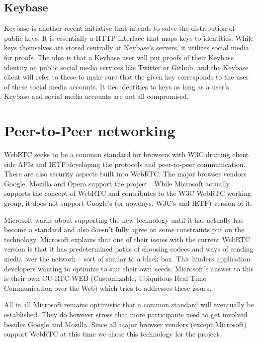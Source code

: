 \subsection{Keybase}
Keybase \cite{Keybase:Online} is another recent initiative that intends to solve the distribution of public keys. It is essentially a HTTP-interface that maps keys to identities. While keys themselves are stored centrally at Keybase's servers, it utilizes social media for proofs. The idea is that a Keybase user will put proofs of their Keybase identity on public social media services like Twitter or Github, and the Keybase client will refer to these to make sure that the given key corresponds to the user of these social media accounts. It ties identities to keys as long as a user's Keybase and social media accounts are not all compromised.

\section{Peer-to-Peer networking}


WebRTC seeks to be a common standard for browsers with W3C drafting client side APIs and IETF developing the protocols and peer-to-peer communication\cite{WebRTCWorkingGroupCharter:2013:Online}. There are also security aspects built into WebRTC. The major browser vendors Google, Mozilla and Opera support the project \cite{WebRTCAndMicrosoft:2012:Online}. While Microsoft actually supports the concept of WebRTC and contributes to the W3C WebRTC working group, it does not support Google’s (or nowdays, W3C’s and IETF) version of it\cite{WebRTCAndMicrosoft:2012:Online}.

Microsoft warns about supporting the new technology until it has actually has become a standard and also doesn’t fully agree on some constraints put on the technology\cite{WebRTCAndMicrosoft:2012:Online}. Microsoft explains that one of their issues with the current WebRTC version is that it has predetermined paths of choosing codecs and ways of sending media over the network – sort of similar to a black box. This hinders application developers wanting to optimize to suit their own needs. Microsoft’s answer to this is their own CU-RTC-WEB (Customizable, Ubiquitous Real Time Communication over the Web) which tries to addresses these issues.

All in all Microsoft remains optimistic that a common standard will eventually be established\cite{WebRTCAndMicrosoft:2012:Online}. They do however stress that more participants need to get involved besides Google and Mozilla. Since all major browser vendors (except Microsoft) support WebRTC at this time we chose this technology for the project.


